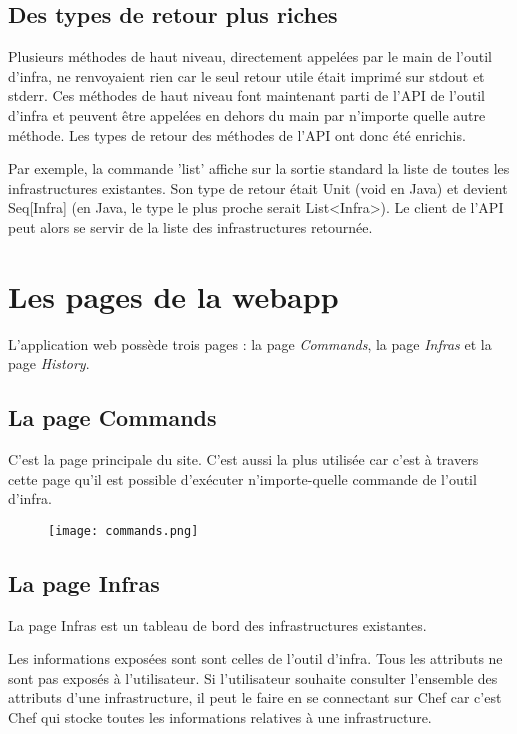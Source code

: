 \subsection{Des types de retour plus riches}

Plusieurs méthodes de haut niveau, directement appelées par le main de l'outil
d'infra, ne renvoyaient rien car le seul retour utile était imprimé
sur stdout et stderr. Ces méthodes de haut niveau font maintenant parti de l'API
de l'outil d'infra et peuvent être appelées en dehors du main par n'importe
quelle autre méthode.
Les types de retour des méthodes de l'API ont donc été enrichis.

Par exemple, la commande 'list' affiche sur la sortie standard la liste de
toutes les infrastructures existantes.
Son type de retour était Unit (void en Java) et devient Seq[Infra] (en Java, le
type le plus proche serait List<Infra>).
Le client de l'API peut alors se servir de la liste des infrastructures retournée.

\section{Les pages de la webapp}
L'application web possède trois pages :
la page \textit{Commands}, la page \textit{Infras} et la page \textit{History}.

\subsection{La page Commands}

C'est la page principale du site. C'est aussi la plus utilisée car c'est à
travers cette page qu'il est possible d'exécuter n'importe-quelle commande de
l'outil d'infra. 

\begin{figure}[H]
  \texttt{[image: commands.png]}  
\end{figure}

\subsection{La page Infras}

La page Infras est un tableau de bord des infrastructures existantes.

Les informations exposées sont sont celles de l'outil d'infra. Tous les
attributs ne sont pas exposés à l'utilisateur. Si l'utilisateur souhaite
consulter l'ensemble des attributs d'une infrastructure, il peut le faire en se
connectant sur Chef car c'est Chef qui stocke toutes les informations relatives
à une infrastructure.

